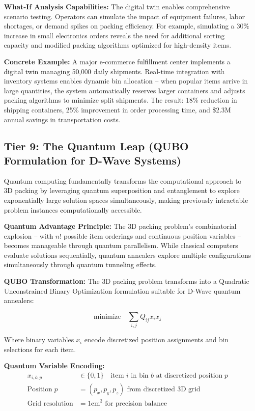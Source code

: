 \documentclass{article}
\begin{document}
\textbf{What-If Analysis Capabilities:} The digital twin enables comprehensive scenario testing. Operators can simulate the impact of equipment failures, labor shortages, or demand spikes on packing efficiency. For example, simulating a 30\% increase in small electronics orders reveals the need for additional sorting capacity and modified packing algorithms optimized for high-density items.

\textbf{Concrete Example:} A major e-commerce fulfillment center implements a digital twin managing 50,000 daily shipments. Real-time integration with inventory systems enables dynamic bin allocation -- when popular items arrive in large quantities, the system automatically reserves larger containers and adjusts packing algorithms to minimize split shipments. The result: 18\% reduction in shipping containers, 25\% improvement in order processing time, and \$2.3M annual savings in transportation costs.

\subsection{Tier 9: The Quantum Leap (QUBO Formulation for D-Wave Systems)}

Quantum computing fundamentally transforms the computational approach to 3D packing by leveraging quantum superposition and entanglement to explore exponentially large solution spaces simultaneously, making previously intractable problem instances computationally accessible.

\textbf{Quantum Advantage Principle:} The 3D packing problem's combinatorial explosion -- with $n!$ possible item orderings and continuous position variables -- becomes manageable through quantum parallelism. While classical computers evaluate solutions sequentially, quantum annealers explore multiple configurations simultaneously through quantum tunneling effects.

\textbf{QUBO Transformation:} The 3D packing problem transforms into a Quadratic Unconstrained Binary Optimization formulation suitable for D-Wave quantum annealers:

\[
\text{minimize} \quad \sum_{i,j} Q_{ij} x_i x_j
\]

Where binary variables $x_i$ encode discretized position assignments and bin selections for each item.

\textbf{Quantum Variable Encoding:}
\begin{align}
x_{i,b,p} &\in \{0,1\} \quad \text{item } i \text{ in bin } b \text{ at discretized position } p \\
\text{Position } p &= (p_x, p_y, p_z) \text{ from discretized 3D grid} \\
\text{Grid resolution} &= 1\text{cm}^3 \text{ for precision balance}
\end{align}
\end{document}
